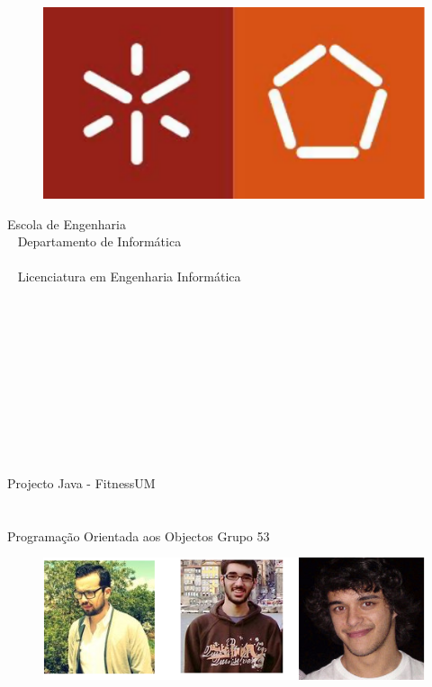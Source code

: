 \documentclass[12pt,notitlepage]{article}
\begin{document}
\begin{titlepage}
\begin{figure}
\centering
\includegraphics[scale=0.5]{logo.pdf}
\end{figure}



\begin{center}

Escola de Engenharia \\~  Departamento de Informática \\~ \\~ Licenciatura em Engenharia Informática \\~ \\~ \\~  \\~ \\~ \\~ \\~ \\~ \\~ \\~


{\Huge Projecto Java - FitnessUM }
\\~ \\~ \\
Programação Orientada aos Objectos
  \vfill
Grupo 53

\begin{figure}[h]
\centering

\end{figure}

\begin{figure}[h]
\centering
\includegraphics[scale=0.6]{autores.png}
\end{figure}


\end{center}
\end{titlepage}
\end{document}
